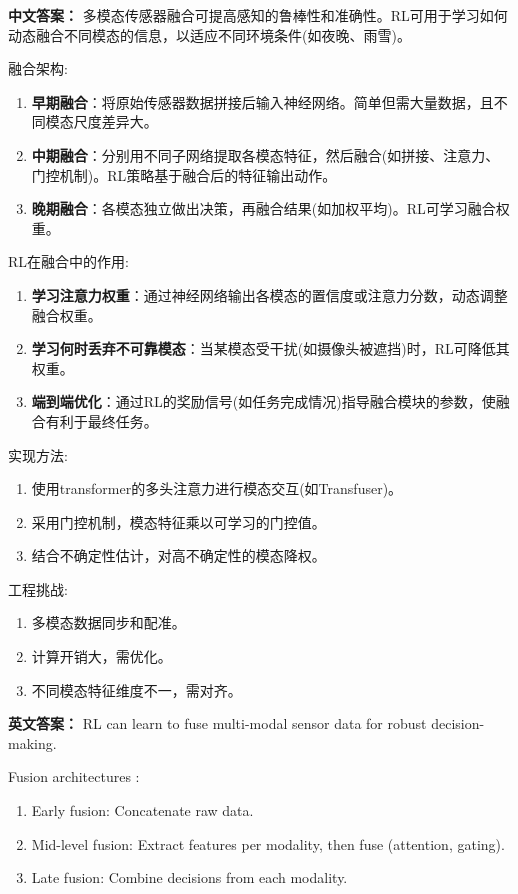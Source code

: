 \documentclass[10pt,a4paper]{ctexart}
\begin{document}
\textbf{中文答案：}  
多模态传感器融合可提高感知的鲁棒性和准确性。RL可用于学习如何动态融合不同模态的信息，以适应不同环境条件(如夜晚、雨雪)。

 融合架构:
\begin{enumerate}
    \item \textbf{早期融合}：将原始传感器数据拼接后输入神经网络。简单但需大量数据，且不同模态尺度差异大。
    \item \textbf{中期融合}：分别用不同子网络提取各模态特征，然后融合(如拼接、注意力、门控机制)。RL策略基于融合后的特征输出动作。
    \item \textbf{晚期融合}：各模态独立做出决策，再融合结果(如加权平均)。RL可学习融合权重。
\end{enumerate}

 RL在融合中的作用:
\begin{enumerate}
    \item \textbf{学习注意力权重}：通过神经网络输出各模态的置信度或注意力分数，动态调整融合权重。
    \item \textbf{学习何时丢弃不可靠模态}：当某模态受干扰(如摄像头被遮挡)时，RL可降低其权重。
    \item \textbf{端到端优化}：通过RL的奖励信号(如任务完成情况)指导融合模块的参数，使融合有利于最终任务。
\end{enumerate}

 实现方法:
\begin{enumerate}
    \item 使用transformer的多头注意力进行模态交互(如Transfuser)。
    \item 采用门控机制，模态特征乘以可学习的门控值。
    \item 结合不确定性估计，对高不确定性的模态降权。
\end{enumerate}

 工程挑战:
\begin{enumerate}
    \item 多模态数据同步和配准。
    \item 计算开销大，需优化。
    \item 不同模态特征维度不一，需对齐。
\end{enumerate}

\textbf{英文答案：}  
RL can learn to fuse multi-modal sensor data for robust decision-making.

 Fusion architectures :
\begin{enumerate}
    \item Early fusion: Concatenate raw data.
    \item Mid-level fusion: Extract features per modality, then fuse (attention, gating).
    \item Late fusion: Combine decisions from each modality.
\end{enumerate}
\end{document}
